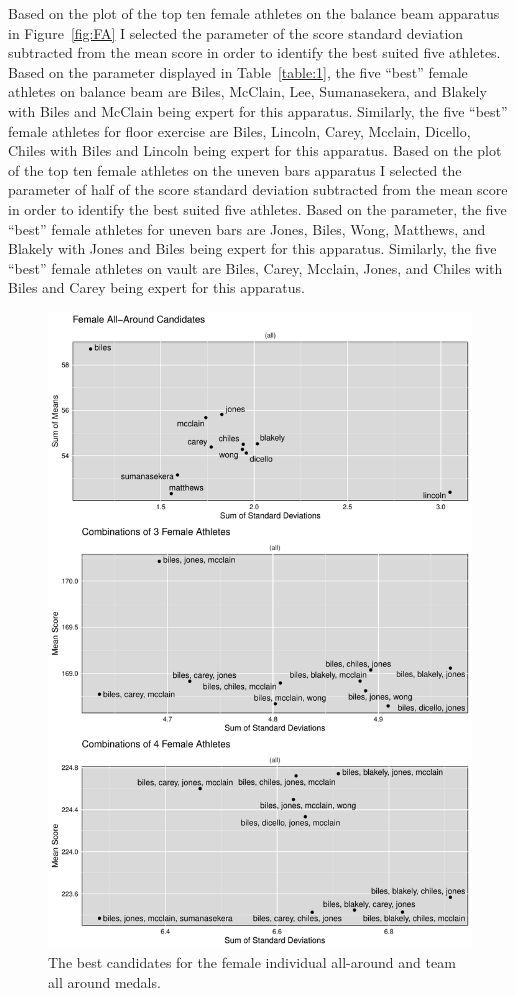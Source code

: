 \documentclass[12pt]{article}
\begin{document}
Based on the plot of the top ten female athletes on the balance beam apparatus in Figure~\ref{fig:FA} I selected the parameter of 
the score standard deviation subtracted from the mean score in order to identify the best suited five 
athletes. Based on the parameter displayed in Table~\ref{table:1}, the five ``best'' female athletes on balance beam are Biles, McClain, 
Lee, Sumanasekera, and Blakely with Biles and McClain being expert for this apparatus. Similarly, the five ``best'' 
female athletes for floor exercise are Biles, Lincoln, Carey, 
Mcclain, Dicello, Chiles with Biles and Lincoln being expert for this apparatus. Based on the plot of the top ten 
female athletes on the uneven bars apparatus I selected the parameter of 
half of the score standard deviation subtracted from the mean score in order to identify the best suited five 
athletes. Based on the parameter, the five ``best'' female athletes for uneven bars are Jones, Biles, Wong, 
Matthews, and Blakely with Jones and Biles being expert for this apparatus. Similarly, the five ``best'' female 
athletes on vault are Biles, Carey, Mcclain, Jones, 
and Chiles with Biles and Carey being expert for this apparatus.

\begin{figure}
  \centering
  \includegraphics[scale=0.55]{FinalFemaleAllAroundPlot.pdf}
  \caption{The best candidates for the female individual all-around and team all around medals.}
  \label{fig:FAA}
\end{figure}
\end{document}
